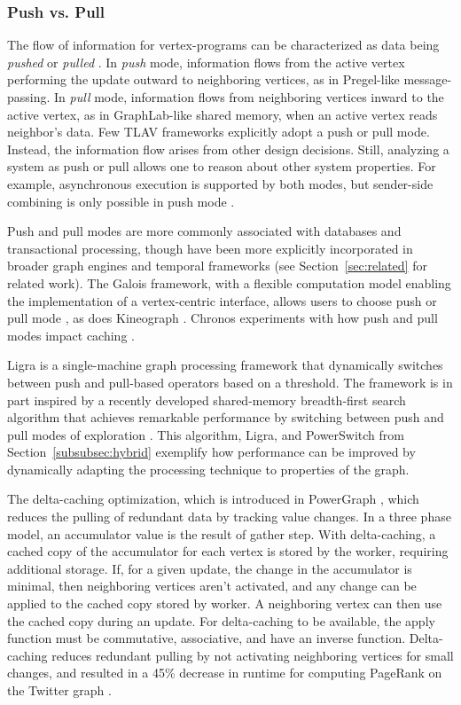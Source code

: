 \documentclass[reprint,twocolumn,showpacs,preprintnumbers,amsmath, aps,pre,amssymb]{revtex4-1}
\begin{document}
\subsubsection{Push vs. Pull}
\label{subsubsec:pushpull}

The flow of information for vertex-programs can be characterized as data being \textit{pushed} or \textit{pulled} \cite{Nguyen2013,Hant2014,Cheng2012}.  In \textit{push} mode, information flows from the active vertex performing the update outward to neighboring vertices, as in Pregel-like message-passing.  In \textit{pull} mode, information flows from neighboring vertices inward to the active vertex, as in GraphLab-like shared memory, when an active vertex reads neighbor's data.  Few TLAV frameworks explicitly adopt a push or pull mode.  Instead, the information flow arises from other design decisions.  Still, analyzing a system as push or pull allows one to reason about other system properties.  For example, asynchronous execution is supported by both modes, but sender-side combining is only possible in push mode \cite{Cheng2012}.

Push and pull modes are more commonly associated with databases and transactional processing, though have been more explicitly incorporated in broader graph engines and temporal frameworks  (see Section~\ref{sec:related} for related work).  The Galois framework, with a flexible computation model enabling the implementation of a vertex-centric interface, allows users to choose push or pull mode \cite{Kulkarni2007,Nguyen2013}, as does Kineograph \cite{Cheng2012}.  Chronos experiments with how push and pull modes impact caching \cite{Hant2014}.

Ligra is a single-machine graph processing framework that dynamically switches between push and pull-based operators based on a threshold.  The framework is in part inspired by a recently developed shared-memory breadth-first search algorithm that achieves remarkable performance by switching between push and pull modes of exploration \cite{Beamer2013}.  This algorithm, Ligra, and PowerSwitch from Section~\ref{subsubsec:hybrid} exemplify how performance can be improved by dynamically adapting the processing technique to properties of the graph.

The delta-caching optimization, which is introduced in PowerGraph \cite{Gonzalez2012}, which reduces the pulling of redundant data by tracking value changes.  In a three phase model, an accumulator value is the result of gather step.  With delta-caching, a cached copy of the accumulator for each vertex is stored by the worker, requiring additional storage.  If, for a given update, the change in the accumulator is minimal, then neighboring vertices aren't activated, and any change can be applied to the cached copy stored by worker.  A neighboring vertex can then use the cached copy during an update.  For delta-caching to be available, the apply function must be commutative, associative, and have an inverse function.  Delta-caching reduces redundant pulling by not activating neighboring vertices for small changes, and resulted in a 45\% decrease in runtime for computing PageRank on the Twitter graph \cite{Gonzalez2012}.
\end{document}
